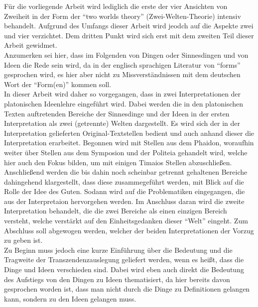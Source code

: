 Für die vorliegende Arbeit wird lediglich die erste der vier Ansichten von Zweiheit in der Form der \enquote{two worlds theory} (Zwei-Welten-Theorie) intensiv behandelt. 
Aufgrund des Umfangs dieser Arbeit wird jeodch auf die Aspekte zwei und vier verzichtet. Dem dritten Punkt wird sich erst mit dem zweiten Teil dieser Arbeit gewidmet.\\
Anzumerken sei hier, dass im Folgenden von Dingen oder Sinnesdingen und von Ideen die Rede sein wird, da in der englisch sprachigen Literatur von \enquote{forms} gesprochen wird, es hier aber nicht zu Missverständnissen mit dem deutschen Wort der \enquote{Form(en)} kommen soll.\\
In dieser Arbeit wird daher so vorgegangen, dass in zwei Interpretationen der platonischen Ideenlehre eingeführt wird. Dabei werden die in den platonischen Texten auftretenden Bereiche der Sinnesdinge und der Ideen in der ersten Interpretation als zwei (getrennte) Welten dargestellt. Es wird sich der in der Interpretation gelieferten Original-Textstellen bedient und auch anhand dieser die Interpretation erarbeitet. Begonnen wird mit Stellen aus dem Phaidon, woraufhin weiter über Stellen aus dem Symposion und der Politeia gehandelt wird, welche hier auch den Fokus bilden, um mit einigen Timaios Stellen abzuschließen. Anschließend werden die bis dahin noch scheinbar getrennt gehaltenen Bereiche dahingehend klargestellt, dass diese zusammegeführt werden, mit Blick auf die Rolle der Idee des Guten. Sodann wird auf die Problematiken eingegangen, die aus der Interpretaion hervorgehen werden. Im Anschluss daran wird die zweite Interpretation behandelt, die die zwei Bereiche als einen einzigen Bereich versteht, welche verstärkt auf den Einheitsgedanken dieser \enquote{Welt} eingeht. Zum Abschluss soll abgewogen werden, welcher der beiden Interpretationen der Vorzug zu geben ist.\\
Zu Beginn muss jedoch eine kurze Einführung über die Bedeutung und die Tragweite der Transzendenzauslegung geliefert werden, wenn es heißt, dass die Dinge und Ideen verschieden sind. Dabei wird eben auch direkt die Bedeutung des Aufstiegs von den Dingen zu Ideen thematisiert, da hier bereits davon gesprochen worden ist, dass man nicht durch die Dinge zu Definitionen gelangen kann, sondern zu den Ideen gelangen muss.

